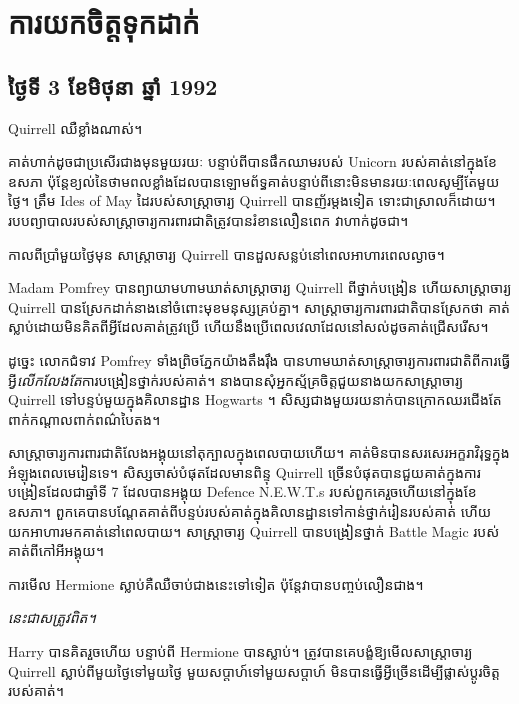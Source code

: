 \chapter{ការយកចិត្តទុកដាក់}

\section{ថ្ងៃទី 3 ខែមិថុនា ឆ្នាំ 1992}

 Quirrell ឈឺខ្លាំងណាស់។

\hplettrineextrapara
គាត់ហាក់ដូចជាប្រសើរជាងមុនមួយរយៈ បន្ទាប់ពីបានផឹកឈាមរបស់ Unicorn របស់គាត់នៅក្នុងខែឧសភា ប៉ុន្តែខ្យល់នៃថាមពលខ្លាំងដែលបានឡោមព័ទ្ធគាត់បន្ទាប់ពីនោះមិនមានរយៈពេលសូម្បីតែមួយថ្ងៃ។ ត្រឹម Ides of May ដៃរបស់សាស្រ្តាចារ្យ Quirrell បានញ័រម្តងទៀត ទោះជាស្រាលក៏ដោយ។ របបព្យាបាលរបស់សាស្ត្រាចារ្យការពារជាតិត្រូវបានរំខានលឿនពេក វាហាក់ដូចជា។

កាលពីប្រាំមួយថ្ងៃមុន សាស្រ្តាចារ្យ Quirrell បានដួលសន្លប់នៅពេលអាហារពេលល្ងាច។

Madam Pomfrey បានព្យាយាមហាមឃាត់សាស្រ្តាចារ្យ Quirrell ពីថ្នាក់បង្រៀន ហើយសាស្រ្តាចារ្យ Quirrell បានស្រែកដាក់នាងនៅចំពោះមុខមនុស្សគ្រប់គ្នា។ សាស្ត្រាចារ្យ​ការពារ​ជាតិ​បាន​ស្រែក​ថា គាត់​ស្លាប់​ដោយ​មិន​គិត​ពី​អ្វី​ដែល​គាត់​ត្រូវ​ប្រើ ហើយ​នឹង​ប្រើ​ពេល​វេលា​ដែល​នៅ​សល់​ដូច​គាត់​ជ្រើសរើស។

ដូច្នេះ លោកជំទាវ Pomfrey ទាំងព្រិចភ្នែកយ៉ាងតឹងរ៉ឹង បានហាមឃាត់សាស្រ្តាចារ្យការពារជាតិពីការធ្វើអ្វី\emph{លើកលែងតែ}ការបង្រៀនថ្នាក់របស់គាត់។ នាង​បាន​សុំ​អ្នក​ស្ម័គ្រ​ចិត្ត​ជួយ​នាង​យក​សាស្ត្រាចារ្យ Quirrell ទៅ​បន្ទប់​មួយ​ក្នុង​គិលានដ្ឋាន Hogwarts ។ សិស្ស​ជាង​មួយ​រយ​នាក់​បាន​ក្រោក​ឈរ​ជើង​តែ​ពាក់​កណ្តាល​ពាក់​ពណ៌​បៃតង។

សាស្ត្រាចារ្យ​ការពារ​ជាតិ​លែង​អង្គុយ​នៅ​តុ​ក្បាល​ក្នុង​ពេល​បាយ​ហើយ។ គាត់មិនបានសរសេរអក្ខរាវិរុទ្ធក្នុងអំឡុងពេលមេរៀនទេ។ សិស្សចាស់បំផុតដែលមានពិន្ទុ Quirrell ច្រើនបំផុតបានជួយគាត់ក្នុងការបង្រៀនដែលជាឆ្នាំទី 7 ដែលបានអង្គុយ Defence N.E.W.T.s របស់ពួកគេរួចហើយនៅក្នុងខែឧសភា។ ពួកគេ​បាន​បណ្តែត​គាត់​ពី​បន្ទប់​របស់គាត់​ក្នុង​គិលានដ្ឋាន​ទៅកាន់​ថ្នាក់រៀន​របស់គាត់ ហើយ​យក​អាហារ​មក​គាត់​នៅពេល​បាយ​។ សាស្រ្តាចារ្យ Quirrell បានបង្រៀនថ្នាក់ Battle Magic របស់គាត់ពីកៅអីអង្គុយ។

ការមើល Hermione ស្លាប់គឺឈឺចាប់ជាងនេះទៅទៀត ប៉ុន្តែវាបានបញ្ចប់លឿនជាង។

\emph{នេះជាសត្រូវពិត។}

Harry បានគិតរួចហើយ បន្ទាប់ពី Hermione បានស្លាប់។ ត្រូវបានគេបង្ខំឱ្យមើលសាស្រ្តាចារ្យ Quirrell ស្លាប់ពីមួយថ្ងៃទៅមួយថ្ងៃ មួយសប្តាហ៍ទៅមួយសប្តាហ៍ មិនបានធ្វើអ្វីច្រើនដើម្បីផ្លាស់ប្តូរចិត្តរបស់គាត់។

